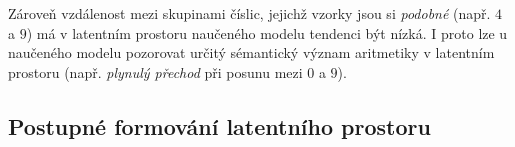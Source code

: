 Zároveň vzdálenost mezi skupinami číslic, jejichž vzorky jsou si \emph{podobné} (např. $4$ a $9$) má v latentním prostoru naučeného modelu tendenci být nízká.
I proto lze u naučeného modelu pozorovat určitý sémantický význam aritmetiky v latentním prostoru (např. \emph{plynulý přechod} při posunu mezi $0$ a $9$).

\subsection{Postupné formování latentního prostoru}
\label{sec:latent_space_development}

\begin{figure}[H]
    \centering
     \\

\end{figure}
